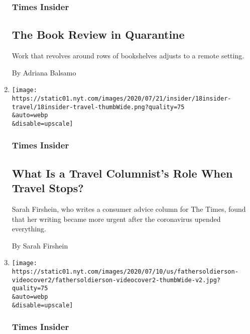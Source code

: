 \begin{enumerate}
  \hypertarget{times-insider-7}{%
  \subsubsection{Times Insider}\label{times-insider-7}}

  \hypertarget{the-book-review-in-quarantine}{%
  \subsection{The Book Review in
  Quarantine}\label{the-book-review-in-quarantine}}

  Work that revolves around rows of bookshelves adjusts to a remote
  setting.

  By Adriana Balsamo
\item
  \href{/2020/07/18/insider/travel-writing-pandemic.html}{}

  \texttt{[image: https://static01.nyt.com/images/2020/07/21/insider/18insider-travel/18insider-travel-thumbWide.png?quality=75\\\&auto=webp\\\&disable=upscale]}

  \hypertarget{times-insider-8}{%
  \subsubsection{Times Insider}\label{times-insider-8}}

  \hypertarget{what-is-a-travel-columnists-role-when-travel-stops}{%
  \subsection{What Is a Travel Columnist's Role When Travel
  Stops?}\label{what-is-a-travel-columnists-role-when-travel-stops}}

  Sarah Firshein, who writes a consumer advice column for The Times,
  found that her writing became more urgent after the coronavirus
  upended everything.

  By Sarah Firshein
\item
  \href{/2020/07/17/insider/father-soldier-son.html}{}

  \texttt{[image: https://static01.nyt.com/images/2020/07/10/us/fathersoldierson-videocover2/fathersoldierson-videocover2-thumbWide-v2.jpg?quality=75\\\&auto=webp\\\&disable=upscale]}

  \hypertarget{times-insider-9}{%
  \subsubsection{Times Insider}\label{times-insider-9}}


\end{enumerate}
